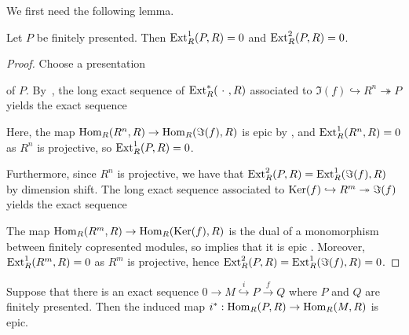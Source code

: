 We first need the following lemma.

\begin{lemma}\label{lem:ext^2-fp-R}
  Let $P$ be finitely presented.
  Then $\mathrm{Ext}^1_R(P,R) = 0$ and $\mathrm{Ext}^2_R(P,R) = 0$.
\end{lemma}

\begin{proof}
  Choose a presentation
  \begin{center}
  \end{center}
  of $P$.
  By~\cite[Theorem 26]{formalising-yoneda-ext}, the long exact sequence of $\mathrm{Ext}^\ast_R(\ \cdot\ , R)$ associated to $\Im(f) \hookrightarrow R^n \twoheadrightarrow P$ yields the exact sequence
  \begin{center}
  \end{center}
  Here, the map $\mathrm{Hom}_R(R^n,R) \to \mathrm{Hom}_R(\Im(f),R)$ is epic by \cite[Lemma 2.3.8]{diffgeo-article}, and $\mathrm{Ext}^1_R(R^n,R) = 0$ as $R^n$ is projective, so $\mathrm{Ext}^1_R(P,R) = 0$.

  Furthermore, since $R^n$ is projective, we have that $\mathrm{Ext}^2_R(P,R) = \mathrm{Ext}^1_R(\Im (f), R)$ by dimension shift.
  The long exact sequence associated to $\operatorname{Ker}(f) \hookrightarrow R^m \twoheadrightarrow \Im (f)$ yields the exact sequence
  \begin{center}
  \end{center}
  The map $\mathrm{Hom}_R(R^m, R) \to \mathrm{Hom}_R(\operatorname{Ker}(f),R)$ is the dual of a monomorphism between
  finitely copresented modules, so  implies that it is epic .
  Moreover, $\mathrm{Ext}^1_R(R^m, R) = 0$ as $R^m$ is projective, hence $\mathrm{Ext}^2_R(P,R) = \mathrm{Ext}^1_R(\Im (f), R) = 0$.
\end{proof}

\begin{lemma}\label{lem:dual-exact-fp-inc}
  Suppose that there is an exact sequence $0 \to M \overset{i}{\hookrightarrow} P \xrightarrow{f} Q$ where $P$ and $Q$ are finitely presented.
  Then the induced map $i^\ast : \mathrm{Hom}_R(P,R) \to \mathrm{Hom}_R(M,R)$ is epic.
\end{lemma}

